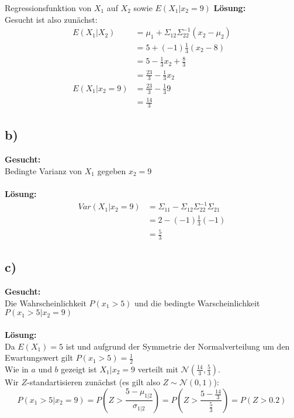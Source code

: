 \documentclass{article}
\begin{document}
Regressionsfunktion von $X_1$ auf $X_2$  sowie $E(X_1|x_2 = 9)$
\textbf{Lösung:}\\

Gesucht ist also zunächst:
\begin{align*}
    E(X_1|X_2) &= \mu_1 + \Sigma_{12} \Sigma_{22}^{-1}(x_2 - \mu_2) \\
    &= 5 + (-1) \frac{1}{3}(x_2 - 8) \\
    &= 5 - \frac{1}{3} x_2 + \frac{8}{3} \\
    &= \frac{23}{3} - \frac{1}{3} x_2 \\ 
    E(X_1| x_2 = 9) &= \frac{23}{3} - \frac{1}{3} 9  \\
    &=  \frac{14}{3}
\end{align*}
\subsection*{b)}
\textbf{Gesucht:}\\

Bedingte Varianz von $X_1$ gegeben $x_2 = 9$\\\\
\textbf{Lösung:}\\

\begin{align*}
    Var(X_1|x_2 = 9) &= \Sigma_{11} - \Sigma_{12}\Sigma_{22}^{-1}\Sigma_{21} \\
    &= 2 - (-1)\frac{1}{3}(-1)\\
    &= \frac{5}{3}
\end{align*}
\subsection*{c)}
\textbf{Gesucht:}\\

Die Wahrscheinlichkeit $P(x_1 > 5)$ und die bedingte Warscheinlichkeit $P(x_1 > 5| x_2 = 9)$\\\\
\textbf{Lösung:}\\

Da $E(X_1) = 5$ ist und aufgrund der Symmetrie der Normalverteilung um den Ewartungswert gilt $P(x_1 > 5) = \frac{1}{2}$ \\


Wie in $a$ und $b$ gezeigt ist $X_1|x_2 = 9$  verteilt mit $\mathcal{N}(\frac{14}{3}, \frac{5}{3})$. \\

Wir $Z$-standartisieren zunächst (es gilt also $Z \sim \mathcal{N}(0,1)$): \[P(x_1 > 5| x_2 = 9) = P(Z > \frac{5 - \mu_{1|2}}{\sigma_{1|2}}) = P(Z > \frac{5- \frac{14}{3}}{\frac{5}{3}}) = P (Z > 0.2) \] 
\end{document}

